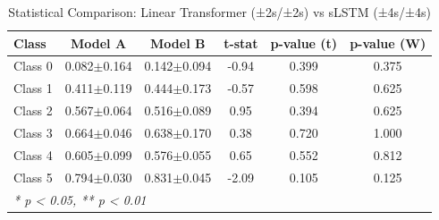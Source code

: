 \begin{table}[htbp]
\centering
\caption{Statistical Comparison: Linear Transformer (±2s/±2s) vs sLSTM (±4s/±4s)}
\label{tab:comparison_class_linear_transformer_±2s_±2s_vs_slstm_±4s_±4s}
\begin{tabular}{lccccc}
\toprule
\textbf{Class} & \textbf{Model A} & \textbf{Model B} & \textbf{t-stat} & \textbf{p-value (t)} & \textbf{p-value (W)} \\
\midrule
Class 0 & 0.082$\pm$0.164 & 0.142$\pm$0.094 & -0.94 & 0.399 & 0.375 \\
Class 1 & 0.411$\pm$0.119 & 0.444$\pm$0.173 & -0.57 & 0.598 & 0.625 \\
Class 2 & 0.567$\pm$0.064 & 0.516$\pm$0.089 & 0.95 & 0.394 & 0.625 \\
Class 3 & 0.664$\pm$0.046 & 0.638$\pm$0.170 & 0.38 & 0.720 & 1.000 \\
Class 4 & 0.605$\pm$0.099 & 0.576$\pm$0.055 & 0.65 & 0.552 & 0.812 \\
Class 5 & 0.794$\pm$0.030 & 0.831$\pm$0.045 & -2.09 & 0.105 & 0.125 \\
\bottomrule
\multicolumn{6}{l}{\textit{* p < 0.05, ** p < 0.01}} \\
\end{tabular}
\end{table}